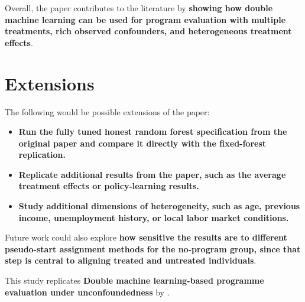 \documentclass[12pt]{article}
\begin{document}
Overall, the paper contributes to the literature by \textbf{showing how double machine learning can be used for program evaluation with multiple treatments, rich observed confounders, and heterogeneous treatment effects}.

\section{Extensions}

The following would be possible extensions of the paper:

\begin{itemize}
    \item \textbf{Run the fully tuned honest random forest specification from the original paper and compare it directly with the fixed-forest replication.}
    \item \textbf{Replicate additional results from the paper, such as the average treatment effects or policy-learning results.}
    \item \textbf{Study additional dimensions of heterogeneity, such as age, previous income, unemployment history, or local labor market conditions.}
\end{itemize}

Future work could also explore \textbf{how sensitive the results are to different pseudo-start assignment methods for the no-program group, since that step is central to aligning treated and untreated individuals}.

This study replicates \textbf{Double machine learning-based programme evaluation under unconfoundedness} by \citet{knaus2022}.



\end{document}

